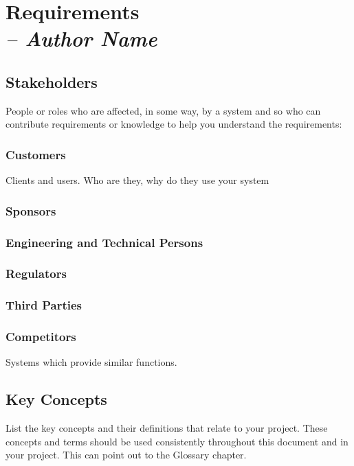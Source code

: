 \chapter{Requirements \\
\small{\textit{-- Author Name}}
\label{Chapter::Requirements}}

\section{Stakeholders}

People or roles who are affected, in some way, by a system and so who can contribute requirements or
knowledge to help you understand the requirements:

\subsection{Customers} 
Clients and users. Who are they, why do they use your system

\subsection{Sponsors}

\subsection{Engineering and Technical Persons}

\subsection{Regulators}

\subsection{Third Parties}

\subsection{Competitors} 

Systems which provide similar functions.

\section{Key Concepts}

List the key concepts and their definitions that relate to your project. These concepts and terms
should be used consistently throughout this document and in your project.  This can point out to the Glossary chapter.

